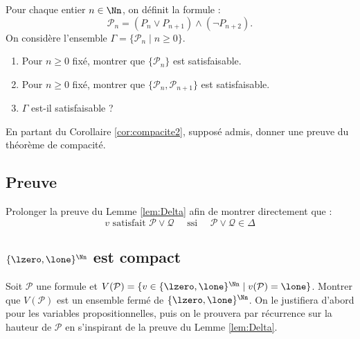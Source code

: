 \documentclass[11pt,class=report,crop=false]{standalone}
\begin{document}
\begin{exercicecours}
	Pour chaque entier $n\in\Nn$, on définit la formule :
	\[
	\mathcal{P}_n
	= (P_n \lor P_{n+1}) \land (\lnot P_{n+2}).
	\]
	On considère l'ensemble $\Gamma = \{\mathcal{P}_n \mid n \ge 0\}$.
	
	\begin{enumerate}
		\item Pour $n\ge 0$ fixé, montrer que $\{ \mathcal{P}_n \}$ est satisfaisable.
		\item Pour $n\ge 0$ fixé, montrer que $\{ \mathcal{P}_n, \mathcal{P}_{n+1} \}$ est satisfaisable.
		\item $\Gamma$ est-il satisfaisable ?
	\end{enumerate}
\end{exercicecours}


\begin{exercicecours}
  En partant du Corollaire \ref{cor:compacite2}, supposé admis, donner une preuve du théorème de compacité.
\end{exercicecours}


\subsection*{Preuve}

\begin{exercicecours}
	Prolonger la preuve du Lemme \ref{lem:Delta} afin de montrer directement que :
	\[
	v \text{ satisfait } \mathcal{P} \lor \mathcal{Q}
	\quad  \text{ ssi }  \quad
	\mathcal{P} \lor \mathcal{Q} \in \Delta
	\]
\end{exercicecours}


\subsection*{$\{\lzero,\lone\}^\Nn$ est compact}

\begin{exercicecours}
	Soit $\mathcal{P}$ une formule et $V(\mathcal{P}) = \{ v \in \{\lzero,\lone\}^\Nn \mid v(\mathcal{P}) = \lone \}$. Montrer que $V(\mathcal{P})$ est un ensemble fermé de $\{\lzero,\lone\}^\Nn$. On le justifiera d'abord pour les variables propositionnelles, puis on le prouvera par récurrence sur la hauteur de $\mathcal{P}$ en s'inspirant de la preuve du Lemme \ref{lem:Delta}.
\end{exercicecours}
\end{document}
